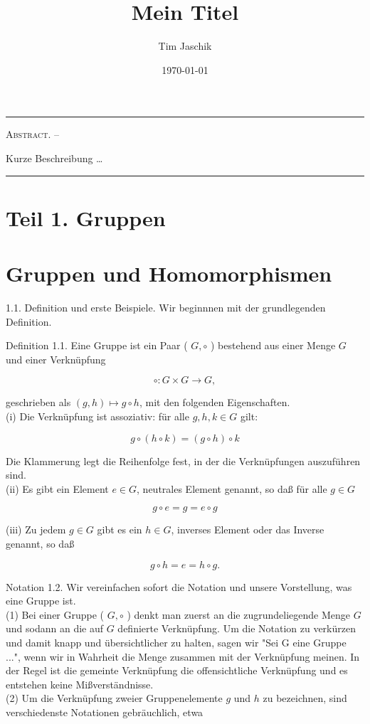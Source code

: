 \documentclass[10pt, letterpaper]{article}
\title{Mein Titel}
\author{Tim Jaschik}
\date{\today}
\renewenvironment{abstract}
  {
    \begin{adjustwidth}{1.5cm}{1.5cm}
    \small
    \textsc{Abstract. –}%
  }
  {
    \end{adjustwidth}
  }
\begin{document}
\maketitle
\rule{\textwidth}{0.5pt}
\begin{abstract}
Kurze Beschreibung …
\end{abstract}
\rule{\textwidth}{0.5pt}
\vspace{0.5cm}




\tableofcontents

\pagebreak


\section*{Teil 1. Gruppen}
\section*{Gruppen und Homomorphismen}
1.1. Definition und erste Beispiele. Wir beginnnen mit der grundlegenden Definition.

Definition 1.1. Eine Gruppe ist ein Paar ( $G, \circ$ ) bestehend aus einer Menge $G$ und einer Verknüpfung

$$
\circ: G \times G \rightarrow G,
$$

geschrieben als $(g, h) \mapsto g \circ h$, mit den folgenden Eigenschaften.\\
(i) Die Verknüpfung ist assoziativ: für alle $g, h, k \in G$ gilt:

$$
g \circ(h \circ k)=(g \circ h) \circ k
$$

Die Klammerung legt die Reihenfolge fest, in der die Verknüpfungen auszuführen sind.\\
(ii) Es gibt ein Element $e \in G$, neutrales Element genannt, so daß für alle $g \in G$

$$
g \circ e=g=e \circ g
$$

(iii) Zu jedem $g \in G$ gibt es ein $h \in G$, inverses Element oder das Inverse genannt, so daß

$$
g \circ h=e=h \circ g .
$$

Notation 1.2. Wir vereinfachen sofort die Notation und unsere Vorstellung, was eine Gruppe ist.\\
(1) Bei einer Gruppe ( $G, \circ$ ) denkt man zuerst an die zugrundeliegende Menge $G$ und sodann an die auf $G$ definierte Verknüpfung. Um die Notation zu verkürzen und damit knapp und übersichtlicher zu halten, sagen wir "Sei G eine Gruppe ...", wenn wir in Wahrheit die Menge zusammen mit der Verknüpfung meinen. In der Regel ist die gemeinte Verknüpfung die offensichtliche Verknüpfung und es entstehen keine Mißverständnisse.\\
(2) Um die Verknüpfung zweier Gruppenelemente $g$ und $h$ zu bezeichnen, sind verschiedenste Notationen gebräuchlich, etwa
\end{document}
